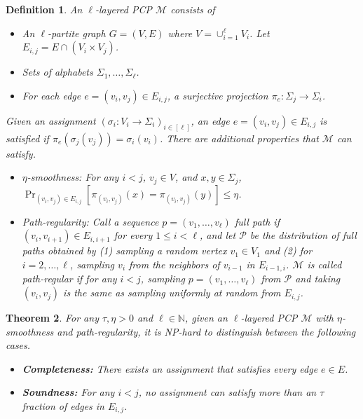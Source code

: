 \documentclass[11pt]{article}
\newtheorem{theorem}{Theorem}[section]
\newtheorem{definition}[theorem]{Definition}
\newcommand{\thmlab}[1]{\label{thm:#1}}
\newcommand{\calm}{\mathcal{M}}
\newcommand{\calp}{\mathcal{P}}
\newcommand{\NN}{\mathbb{N}}
\begin{document}
\begin{definition}
An $\ell$-layered PCP $\calm$ consists of
\begin{itemize}
\item An $\ell$-partite graph $G = (V, E)$ where $V = \cup_{i=1}^{\ell} V_i$. Let $E_{i,j} = E \cap (V_i \times V_j)$. 
\item Sets of alphabets $\Sigma_1, \dots, \Sigma_{\ell}$. 
\item For each edge $e = (v_i, v_j) \in E_{i,j}$, a surjective projection $\pi_e : \Sigma_j \to \Sigma_i$. 
\end{itemize}
Given an assignment $(\sigma_i : V_i \to \Sigma_i)_{i \in [\ell]}$, an edge $e = (v_i, v_j) \in E_{i,j}$ is {\em satisfied} if $\pi_e(\sigma_j(v_j)) = \sigma_i(v_i)$. 
There are additional properties that $\calm$ can satisfy.
\begin{itemize}
\item $\eta$-smoothness: For any $i < j$, $v_j \in V$, and $x, y \in \Sigma_j$, $\Pr_{(v_i, v_j) \in E_{i,j}} [\pi_{(v_i, v_j)}(x) = \pi_{(v_i, v_j)}(y)] \leq \eta$. 
\item Path-regularity: Call a sequence $p = (v_1, \dots, v_{\ell})$ {\em full path} if $(v_i, v_{i+1}) \in E_{i, i+1}$ for every $1 \leq i < \ell$,
and let $\calp$ be the distribution of full paths obtained by (1) sampling a random vertex $v_1 \in V_1$ and (2) for $i = 2, \dots, \ell$, sampling $v_i$ from the neighbors of $v_{i-1}$ in $E_{i-1, i}$. 
$\calm$ is called {\em path-regular} if for any $i < j$, sampling $p = (v_1, \dots, v_{\ell})$ from $\calp$ and taking $(v_i, v_j)$ is the same as sampling uniformly at random from $E_{i,j}$. 
\end{itemize}
\end{definition}


\begin{theorem}
\thmlab{thm:dgkr}
\cite{DGKR05, Khot02}
For any $\tau, \eta > 0$ and $\ell \in \NN$, given an $\ell$-layered PCP $\calm$ with $\eta$-smoothness and path-regularity, it is NP-hard to distinguish between the following cases.
\begin{itemize}
\item {\bf Completeness: } There exists an assignment that satisfies every edge $e \in E$.
\item {\bf Soundness: } For any $i < j$, no assignment can satisfy more than an $\tau$ fraction of edges in $E_{i,j}$. 
\end{itemize}
\end{theorem}
\end{document}
